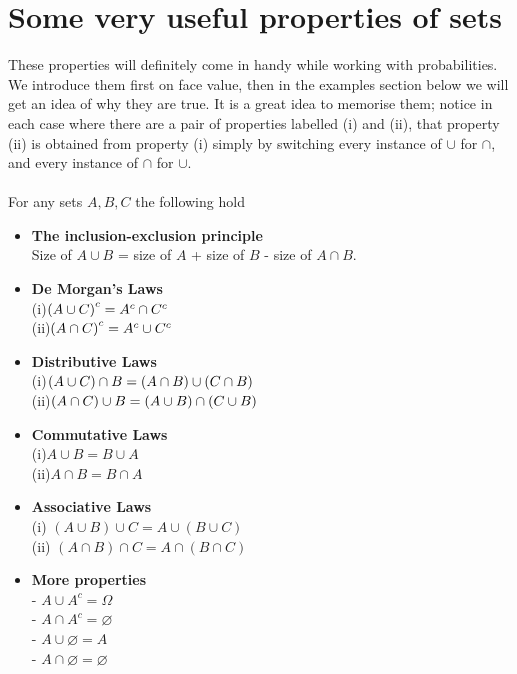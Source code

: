 \section{Some very useful properties of sets} \label{setproperties1}
These properties will definitely come in handy while working with probabilities. We introduce them first on face value, then in the examples section below we will get an idea of why they are true. It is a great idea to memorise them; notice in each case where there are a pair of properties labelled (i) and (ii), that property (ii) is obtained from property (i) simply by switching every instance of $\cup$ for $\cap$, and every instance of $\cap$ for $\cup$. \\ \\
For any sets $A,B,C$ the following hold
\begin{itemize}
	\item \textbf{The inclusion-exclusion principle} \label{inclusion-exclusion principle} \\
	Size of $A \cup B$ = size of $A$ + size of $B$ - size of $A \cap B$.
	\item \textbf{De Morgan's Laws} \label{de-morgans laws} \\
	(i)\;\;\;$\left(A \cup C\right)^c = A^c \cap C^c$ \\
	(ii)\;\;$\left(A \cap C\right)^c = A^c \cup C^c$
	\item \textbf{Distributive Laws} \label{distributive law} \\
	(i)\;\;\;$\left(A \cup C\right) \cap B = (A \cap B) \cup (C \cap B)$ \\
	(ii)\;\;$\left(A \cap C\right) \cup B = (A \cup B) \cap (C \cup B)$
	\item \textbf{Commutative Laws} \label{commutative law} \\
	(i)\;\;\;$A \cup B = B \cup A$ \\
	(ii)\;\;$A \cap B = B \cap A$
	\item \textbf{Associative Laws} \label{associative law} \\
	(i)\;\;\; $(A \cup B) \cup C = A \cup (B \cup C)$ \\
	(ii)\;\; $(A \cap B) \cap C = A \cap (B \cap C)$
	\item \textbf{More properties} \label{more properties} \\
	- \;\;\; $A \cup A^c = \Omega$ \\
	- \;\;\; $A \cap A^c = \varnothing$ \\
	- \;\;\; $A \cup \varnothing = A$ \\
	- \;\;\; $A \cap \varnothing = \varnothing$
\end{itemize}




